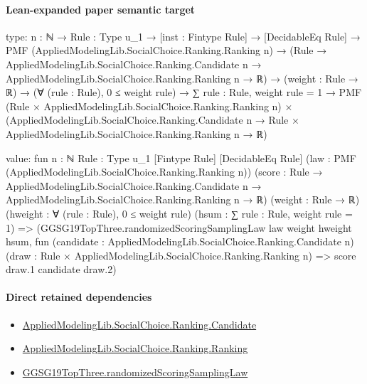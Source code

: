 \documentclass[10pt]{article}
\begin{document}
\paragraph{Lean-expanded paper semantic target}
\begin{ReviewVerbatim}
type:
{n : ℕ} →
  {Rule : Type u_1} →
    [inst : Fintype Rule] →
      [DecidableEq Rule] →
        PMF (AppliedModelingLib.SocialChoice.Ranking.Ranking n) →
          (Rule →
              AppliedModelingLib.SocialChoice.Ranking.Candidate n →
                AppliedModelingLib.SocialChoice.Ranking.Ranking n → ℝ) →
            (weight : Rule → ℝ) →
              (∀ (rule : Rule), 0 ≤ weight rule) →
                ∑ rule : Rule, weight rule = 1 →
                  PMF (Rule × AppliedModelingLib.SocialChoice.Ranking.Ranking n) ×
                    (AppliedModelingLib.SocialChoice.Ranking.Candidate n →
                      Rule × AppliedModelingLib.SocialChoice.Ranking.Ranking n → ℝ)

value:
fun {n : ℕ} {Rule : Type u_1} [Fintype Rule] [DecidableEq Rule]
    (law : PMF (AppliedModelingLib.SocialChoice.Ranking.Ranking n))
    (score :
      Rule →
        AppliedModelingLib.SocialChoice.Ranking.Candidate n → AppliedModelingLib.SocialChoice.Ranking.Ranking n → ℝ)
    (weight : Rule → ℝ) (hweight : ∀ (rule : Rule), 0 ≤ weight rule) (hsum : ∑ rule : Rule, weight rule = 1) =>
  (GGSG19TopThree.randomizedScoringSamplingLaw law weight hweight hsum,
    fun (candidate : AppliedModelingLib.SocialChoice.Ranking.Candidate n)
      (draw : Rule × AppliedModelingLib.SocialChoice.Ranking.Ranking n) =>
    score draw.1 candidate draw.2)
\end{ReviewVerbatim}

\paragraph{Direct retained dependencies}
\begin{itemize}\raggedright
\item \hyperlink{governing-declaration-8c0e6c25845ae78a}{Applied\allowbreak{}Modeling\allowbreak{}Lib.\allowbreak{}Social\allowbreak{}Choice.\allowbreak{}Ranking.\allowbreak{}Candidate}
\item \hyperlink{governing-declaration-5cde54446d1ae021}{Applied\allowbreak{}Modeling\allowbreak{}Lib.\allowbreak{}Social\allowbreak{}Choice.\allowbreak{}Ranking.\allowbreak{}Ranking}
\item \hyperlink{governing-declaration-922a180b2050e06e}{GGSG19\allowbreak{}Top\allowbreak{}Three.\allowbreak{}randomized\allowbreak{}Scoring\allowbreak{}Sampling\allowbreak{}Law}
\end{itemize}
\end{document}
